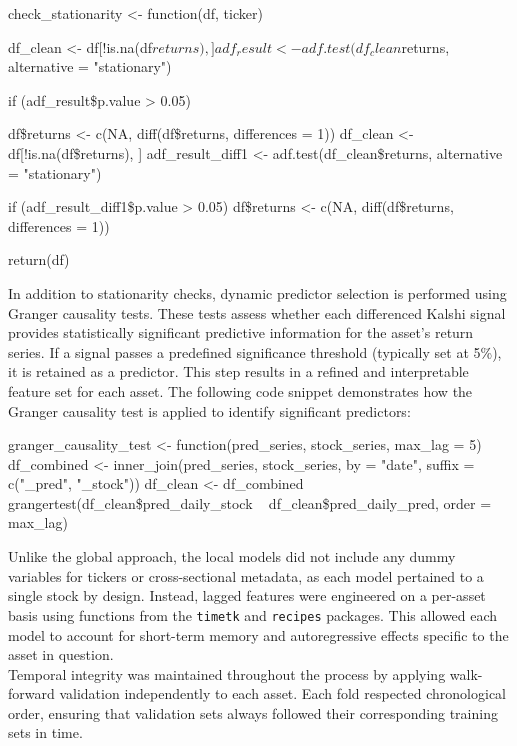 \documentclass[12pt]{report}
\begin{document}
\newpage
\begin{code}[language=R,caption={Stationarity test with successive differencing}]
check_stationarity <- function(df, ticker) {
  df_clean <- df[!is.na(df$returns), ]
  adf_result <- adf.test(df_clean$returns, alternative = "stationary")
  
  if (adf_result\$p.value > 0.05) {
    df\$returns <- c(NA, diff(df\$returns, differences = 1))
    df_clean <- df[!is.na(df\$returns), ]
    adf_result_diff1 <- adf.test(df_clean\$returns, alternative = "stationary")
    
    if (adf_result_diff1\$p.value > 0.05) {
      df\$returns <- c(NA, diff(df\$returns, differences = 1))
    }
  }
  return(df)
}
\end{code}

In addition to stationarity checks, dynamic predictor selection is performed using Granger causality tests. These tests assess whether each differenced Kalshi signal provides statistically significant predictive information for the asset's return series. If a signal passes a predefined significance threshold (typically set at 5\%), it is retained as a predictor. This step results in a refined and interpretable feature set for each asset. The following code snippet demonstrates how the Granger causality test is applied to identify significant predictors:\\

\begin{code}[language=R,caption={Test de causalité de Granger entre les séries}]
granger_causality_test <- function(pred_series, stock_series, max_lag = 5) {
  df_combined <- inner_join(pred_series, stock_series, by = "date", suffix = c("_pred", "_stock"))
  df_clean <- df_combined %
  grangertest(df_clean\$pred_daily_stock ~ df_clean\$pred_daily_pred, order = max_lag)
}
\end{code}

Unlike the global approach, the local models did not include any dummy variables for tickers or cross-sectional metadata, as each model pertained to a single stock by design. Instead, lagged features were engineered on a per-asset basis using functions from the \texttt{timetk} and \texttt{recipes} packages. This allowed each model to account for short-term memory and autoregressive effects specific to the asset in question.\\



Temporal integrity was maintained throughout the process by applying walk-forward validation independently to each asset. Each fold respected chronological order, ensuring that validation sets always followed their corresponding training sets in time.\\
\end{document}
